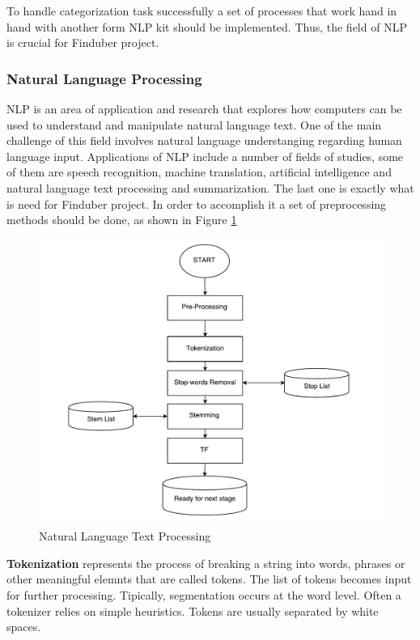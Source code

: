 To handle categorization task successfully a set of processes that work hand in hand with another form NLP kit should be implemented. Thus, the field of NLP is crucial for Finduber project.

\subsubsection{Natural Language Processing}

NLP is an area of application and research that explores how computers can be used to understand and manipulate natural language text. One of the main challenge of this field involves natural language understanging regarding human language input. Applications of NLP include a number of fields of studies, some of them are speech recognition, machine translation, artificial intelligence and natural language text processing and summarization. The last one is exactly what is need for Finduber project. In order to accomplish it a set of preprocessing methods should be done, as shown in Figure \ref{text}

\begin{figure}[!ht]
\centering
\includegraphics[width=15cm]{textmining}
\caption{Natural Language Text Processing}\label{text}
\end{figure}

\textbf{Tokenization} represents the process of breaking a string into words, phrases or other meaningful elemnts that are called tokens. The list of tokens becomes input for further processing. Tipically, segmentation occurs at the word level. Often a tokenizer relies on simple heuristics. Tokens are usually separated by white spaces. 

